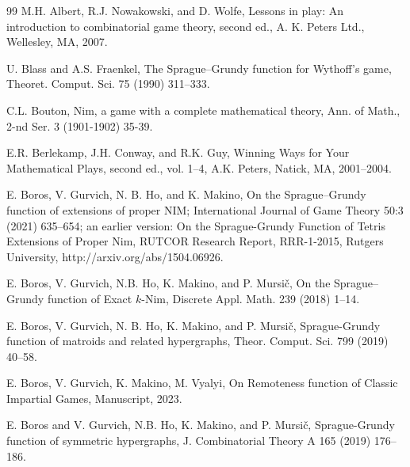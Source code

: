\documentclass{article}
\theoremstyle{definition}
\begin{document}
\begin{thebibliography}{99}
M.H. Albert, R.J. Nowakowski, and D. Wolfe,
Lessons in play: An introduction to combinatorial game theory,
second ed., A. K. Peters Ltd., Wellesley, MA, 2007.

U. Blass and  A.S. Fraenkel, 
The Sprague–Grundy function for Wythoff’s game, 
Theoret. Comput. Sci. 75 (1990) 311--333.

C.L. Bouton, Nim, a game with a complete mathematical theory,
Ann. of Math., 2-nd Ser. 3 (1901-1902) 35-39.

E.R. Berlekamp, J.H. Conway, and R.K. Guy, 
Winning Ways for Your Mathematical Plays, second ed., vol. 1–4, 
A.K. Peters, Natick, MA, 2001--2004.

E. Boros, V. Gurvich, N. B. Ho, and K. Makino,
On the Sprague--Grundy function of extensions of proper NIM;
International Journal of Game Theory 50:3 (2021) 635--654;
an earlier version: 
On the Sprague-Grundy Function of Tetris Extensions of Proper {\sc Nim},
RUTCOR Research Report, RRR-1-2015, Rutgers University,
http://arxiv.org/abs/1504.06926. 

E. Boros, V. Gurvich, N.B. Ho, K. Makino, and P. Mursi\v{c},
On the Sprague–Grundy function of Exact $k$-Nim,
Discrete Appl. Math. 239 (2018) 1--14.


E. Boros, V. Gurvich, N. B. Ho, K. Makino, and  P. Mursi\v{c}, 
Sprague-Grundy function of matroids and related hypergraphs, 
Theor. Comput. Sci. 799 (2019) 40--58. 

E. Boros, V. Gurvich, K. Makino, M. Vyalyi, 
On Remoteness function of Classic Impartial Games, 
Manuscript, 2023. 

E. Boros and V. Gurvich, 
N.B. Ho, K. Makino, and P. Mursi\v{c}, 
Sprague-Grundy function of symmetric hypergraphs,
J. Combinatorial Theory A 165 (2019) 176--186. 


\end{thebibliography}
\end{document}
